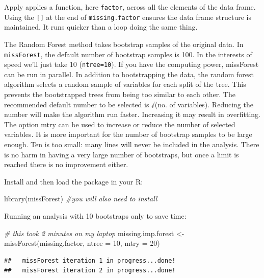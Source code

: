 \documentclass[
]{book}
\newenvironment{Shaded}{\begin{snugshade}}{\end{snugshade}}
\newcommand{\AttributeTok}[1]{\textcolor[rgb]{0.77,0.63,0.00}{#1}}
\newcommand{\CommentTok}[1]{\textcolor[rgb]{0.56,0.35,0.01}{\textit{#1}}}
\newcommand{\DecValTok}[1]{\textcolor[rgb]{0.00,0.00,0.81}{#1}}
\newcommand{\FunctionTok}[1]{\textcolor[rgb]{0.00,0.00,0.00}{#1}}
\newcommand{\NormalTok}[1]{#1}
\newcommand{\OtherTok}[1]{\textcolor[rgb]{0.56,0.35,0.01}{#1}}
\begin{document}
Apply applies a function, here \texttt{factor}, across all the elements of the data frame. Using the \texttt{{[}{]}} at the end of \texttt{missing.factor} ensures the data frame structure is maintained. It runs quicker than a loop doing the same thing.

The Random Forest method takes bootstrap samples of the original data. In \texttt{missForest}, the default number of bootstrap samples is 100. In the interests of speed we'll just take 10 (\texttt{ntree=10}). If you have the computing power, missForest can be run in parallel. In addition to bootstrapping the data, the random forest algorithm selects a random sample of variables for each split of the tree. This prevents the bootstrapped trees from being too similar to each other. The recommended default number to be selected is √(no. of variables). Reducing the number will make the algorithm run faster. Increasing it may result in overfitting. The option mtry can be used to increase or reduce the number of selected variables. It is more important for the number of bootstrap samples to be large enough. Ten is too small: many lines will never be included in the analysis. There is no harm in having a very large number of bootstraps, but once a limit is reached there is no improvement either.

Install and then load the package in your R:

\begin{Shaded}
\begin{Highlighting}[]
\FunctionTok{library}\NormalTok{(missForest)  }\CommentTok{\#you will also need to install}
\end{Highlighting}
\end{Shaded}

Running an analysis with 10 bootstraps only to save time:

\begin{Shaded}
\begin{Highlighting}[]
\CommentTok{\# this took 2 minutes on my laptop}
\NormalTok{missing.imp.forest }\OtherTok{\textless{}{-}} \FunctionTok{missForest}\NormalTok{(missing.factor, }\AttributeTok{ntree =} \DecValTok{10}\NormalTok{, }
    \AttributeTok{mtry =} \DecValTok{20}\NormalTok{)}
\end{Highlighting}
\end{Shaded}

\begin{verbatim}
##   missForest iteration 1 in progress...done!
##   missForest iteration 2 in progress...done!
\end{verbatim}
\end{document}
